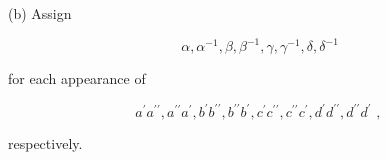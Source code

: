 (b) Assign

\[
\alpha ,{\alpha }^{-1},\beta ,{\beta }^{-1},\gamma ,{\gamma }^{-1},\delta ,{\delta }^{-1}
\]

for each appearance of

\[
{a}^{\prime }{a}^{\prime \prime },{a}^{\prime \prime }{a}^{\prime },{b}^{\prime }{b}^{\prime \prime },{b}^{\prime \prime }{b}^{\prime },{c}^{\prime }{c}^{\prime \prime },{c}^{\prime \prime }{c}^{\prime },{d}^{\prime }{d}^{\prime \prime },{d}^{\prime \prime }{d}^{\prime }\text{ , }
\]

respectively.
